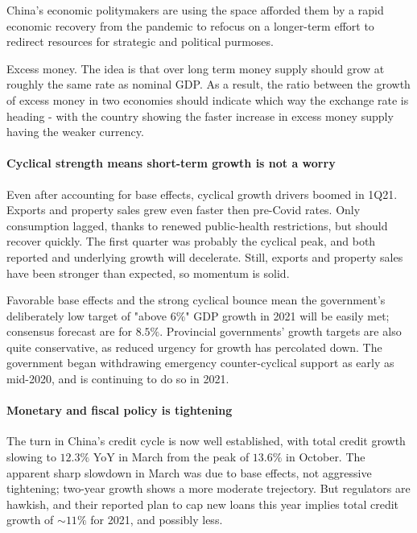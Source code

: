 China's economic politymakers are using the space afforded them by a rapid
economic recovery from the pandemic to refocus on a longer-term effort to
redirect resources for strategic and political purmoses.

\vspace{1\baselineskip}

Excess money. The idea is that over long term money supply should grow at
roughly the same rate as nominal GDP. As a result, the ratio between the
growth of excess money in two economies should indicate which way the
exchange rate is heading - with the country showing the faster increase
in excess money supply having the weaker currency.

\paragraph{Cyclical strength means short-term growth is not a worry}

Even after accounting for base effects, cyclical growth drivers boomed in
1Q21. Exports and property sales grew even faster then pre-Covid rates.
Only consumption lagged, thanks to renewed public-health restrictions,
but should recover quickly. The first quarter was probably the cyclical peak,
and both reported and underlying growth will decelerate. Still, exports and
property sales have been stronger than expected, so momentum is solid.

\vspace{1\baselineskip}

Favorable base effects and the strong cyclical bounce mean the government's
deliberately low target of "above $6\%$" GDP growth in 2021 will be easily
met; consensus forecast are for $8.5\%$. Provincial governments' growth
targets are also quite conservative, as reduced urgency for growth has
percolated down. The government began withdrawing emergency counter-cyclical
support as early as mid-2020, and is continuing to do so in 2021.

\paragraph{Monetary and fiscal policy is tightening}

The turn in China's credit cycle is now well established, with total
credit growth slowing to $12.3\%$ YoY in March from the peak of $13.6\%$
in October. The apparent sharp slowdown in March was due to base effects,
not aggressive tightening; two-year growth shows a more moderate trejectory.
But regulators are hawkish, and their reported plan to cap new loans this
year implies total credit growth of $\sim 11\%$ for 2021, and possibly less.

